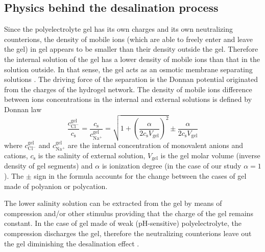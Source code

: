 \documentclass[journal,article,submit,pdftex,moreauthors]{Definitions/mdpi}
\newcommand{\cna}{c_\mathrm{Na^+}}
\newcommand{\ccl}{c_\mathrm{Cl^-}}
\newcommand{\gel}{^\mathrm{gel}}
\newcommand{\cs}{c_{\mathrm{s}}}
\newcommand{\Vgel}{V_\mathrm{gel}}
\begin{document}
\subsection{Physics behind the desalination process}
Since the polyelectrolyte gel has its own charges and its own neutralizing counterions, the density of mobile ions (which are able to freely enter and leave the gel) in gel appears to be smaller than their density outside the gel.
Therefore the internal solution of the gel has a lower density of mobile ions than that in the solution outside. 
In that sense, the gel acts as an osmotic membrane separating solutions \cite{Rud2020}. 
The driving force of the separation is the Donnan potential originated from the charges of the hydrogel network. 
The density of mobile ions difference between ions concentrations in the internal and external solutions
is defined by Donnan law \cite{Rud2018}
\begin{equation}
\frac{\ccl\gel}{\cs}=\frac{\cs}{\cna\gel}=\sqrt{1+\left(\frac{\alpha}{2\cs\Vgel}\right)^{2}}\pm\frac{\alpha}{2\cs\Vgel}
\end{equation}
where $\ccl\gel$ and $\cna\gel$ are the internal concentration of monovalent anions and cations, $\cs$ is the salinity of external solution,  $\Vgel$ is the gel molar volume (inverse density of gel segments) and $\alpha$ is ionization degree (in the case of our study $\alpha=1$). 
The $\pm$ sign in the formula accounts for the change between the cases of gel made of polyanion or polycation.

The lower salinity solution can be extracted from the gel by means of compression and/or other stimulus providing that the charge of the gel remains constant.
In the case of gel made of weak (pH-sensitive) polyelectrolyte, the compression discharges the gel, therefore the neutralizing counterions leave out the gel diminishing the desalination effect \cite{Rud2018}. 
\end{document}
